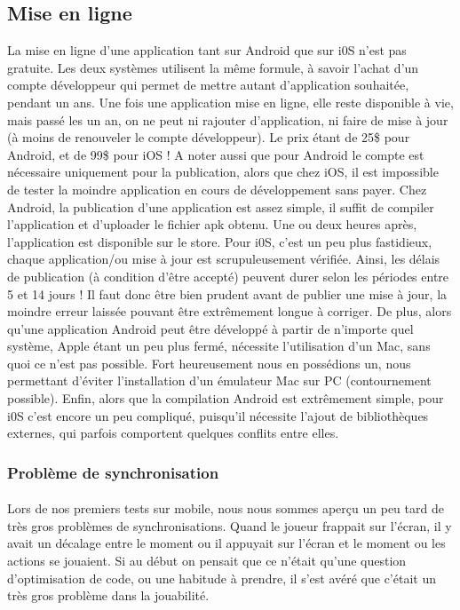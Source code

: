\subsection{Mise en ligne}

La mise en ligne d'une application tant sur Android que sur i0S n'est pas gratuite. Les deux systèmes utilisent la même formule, à savoir l'achat d'un compte développeur qui permet de mettre autant d'application souhaitée, pendant un ans. Une fois une application mise en ligne, elle reste disponible à vie, mais passé les un an, on ne peut ni rajouter d'application, ni faire de mise à jour (à moins de renouveler le compte développeur). Le prix étant de 25\$ pour Android, et de 99\$ pour iOS ! A noter aussi que pour Android le compte est nécessaire uniquement pour la publication, alors que chez iOS, il est impossible de tester la moindre application en cours de développement sans payer.
Chez Android, la publication d'une application est assez simple, il suffit de compiler l'application et d'uploader le fichier apk obtenu. Une ou deux heures après, l'application est disponible sur le store. Pour i0S, c'est un peu plus fastidieux, chaque application/ou mise à jour est scrupuleusement vérifiée. Ainsi, les délais de publication (à condition d'être accepté) peuvent durer selon les périodes entre 5 et 14 jours ! Il faut donc être bien prudent avant de publier une mise à jour, la moindre erreur laissée pouvant être extrêmement  longue à corriger. De plus, alors qu'une application Android peut être développé à partir de n'importe quel système, Apple étant un peu plus fermé, nécessite l'utilisation d'un Mac, sans quoi ce n'est pas possible. Fort heureusement nous en possédions un, nous permettant d'éviter l'installation d'un émulateur Mac sur PC (contournement possible). Enfin, alors que la compilation Android est extrêmement simple, pour i0S c'est encore un peu compliqué, puisqu'il nécessite l'ajout de bibliothèques externes, qui parfois comportent quelques conflits entre elles.

\subsubsection{Problème de synchronisation}

\paragraph{}
Lors de nos premiers tests sur mobile, nous nous sommes aperçu un peu tard de très gros problèmes de synchronisations.
Quand le joueur frappait sur l'écran, il y avait un décalage entre le moment ou il appuyait sur l'écran et le moment ou les actions se jouaient. Si au début on pensait que ce n'était qu'une question d'optimisation de code, ou une habitude à prendre, il s'est avéré que c'était un très gros problème dans la jouabilité.

